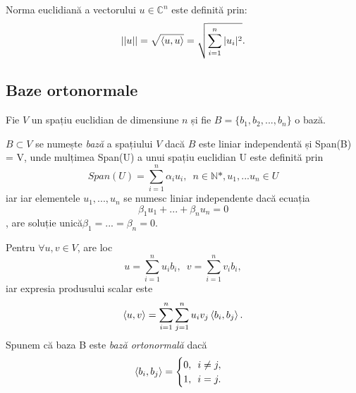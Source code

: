 Norma euclidiană a vectorului $u \in \mathbb{C}^n$ este definită prin:
\[
||u|| = \sqrt{\braket{u,u}} = \sqrt{\sum_{i=1}^{n} |u_i|^2}.
\]

\subsection{Baze ortonormale}

Fie $V$ un spațiu euclidian de dimensiune $n$ și fie $B = \{b_1, b_2, ... , b_n\}$ o bază.

$B \subset V$ se numește \textit{bază} a spațiului $V$ dacă $B$ este liniar independentă și Span(B) = V, unde mulțimea Span(U) a unui spațiu euclidian U este definită prin  \[Span(U) =\sum_{i=1}^{n} \alpha_i u_i, \enspace n \in \mathbb{N}\text{*}, u_1, ... u_n \in U\] iar iar elementele $u_1, ..., u_n$ se numesc liniar independente dacă ecuația \[\beta_1 u_1 + ... + \beta_n u_n =0\], are soluție unică$\beta_1 = ... = \beta_n = 0$.


Pentru $\forall u, v \in V$, are loc 
\[
u = \sum_{i=1}^{n} u_i b_i, \enspace v = \sum_{i=1}^n v_i b_i,
\]
iar expresia produsului scalar este 
\[
\braket{u, v} = \sum_{i=1}^{n} \sum_{j=1}^{n} u_i v_j \braket{b_i, b_j}.
\]
Spunem că baza B este \textit{bază ortonormală} dacă
\[
\braket{b_i, b_j} =
\begin{cases}
0, \enspace i \neq j, \\
1, \enspace i = j.
\end{cases}
\]


